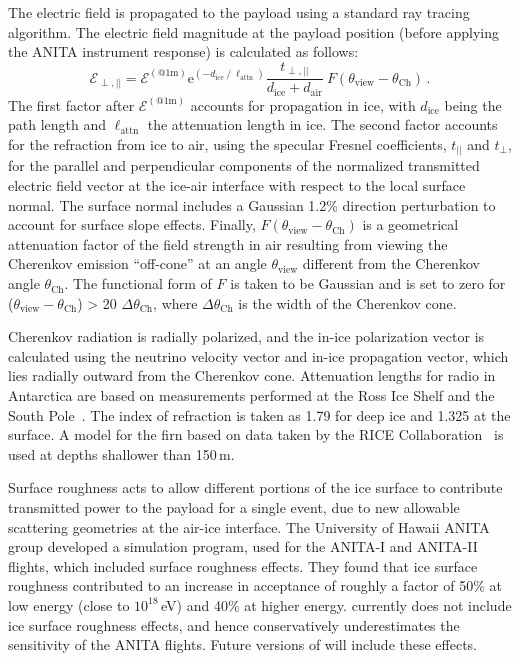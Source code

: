 The electric field is propagated to the payload using a standard ray tracing algorithm.
The electric field magnitude at the payload position (before applying
the ANITA instrument response) is calculated as follows:
\begin{equation}
 \mathcal{E}_{\perp,||} = \mathcal{E}^{(\mathrm{@ 1m})}  
 \mathrm{e}^{(-d_{\mathrm{ice}}\ /\ \ell_{\mathrm{attn}})}
 \frac{t_{\perp,||}}{d_{\mathrm{ice}} + d_{\mathrm{air}}}
 \ F(\theta_{\mathrm{view}}-\theta_{\mathrm{Ch}}) \,.
\end{equation}
The first factor after $\mathcal{E}^{(\mathrm{@ 1m})}$ accounts for propagation in ice, with $d_{\mathrm{ice}}$ being the path length and $\ell_{\mathrm{attn}}$ the attenuation length in ice. 
The second factor accounts for the refraction from ice to air, using
the specular Fresnel coefficients, $t_{||}$ and $t_{\perp}$, for the parallel and perpendicular components of the normalized transmitted electric field vector at the ice-air interface with respect to the local surface normal.
The surface normal includes a Gaussian 1.2\% direction perturbation to account for surface slope effects.
Finally, $F(\theta_{\mathrm{view}}-\theta_{\mathrm{Ch}})$ is a geometrical attenuation factor of the field strength in air resulting from viewing the Cherenkov emission ``off-cone'' at an angle $\theta_{\mathrm{view}}$ different from the Cherenkov angle $\theta_{\mathrm{Ch}}$.
The functional form of $F$ is taken to be Gaussian and is set to zero for ($\theta_{\mathrm{view}}-\theta_{\mathrm{Ch}}$) > 20 $\Delta \theta_{\mathrm{Ch}}$, where $\Delta \theta_{\mathrm{Ch}}$ is the width of the Cherenkov cone. 

Cherenkov radiation is radially polarized, and the in-ice polarization vector is calculated using the neutrino velocity vector and in-ice propagation vector, which lies radially outward from the Cherenkov cone.
Attenuation lengths for radio in Antarctica are based on measurements performed at the Ross Ice Shelf and the South Pole~\cite{smex}.
The index of refraction is taken as 1.79 for deep ice and 1.325 at the surface. A model for the firn based on data taken by the RICE Collaboration~\cite{PhysRevD.73.082002} is used at depths shallower than 150\,m.

Surface roughness acts to allow different portions of the ice surface to contribute transmitted power to the payload for a single event, due to new allowable scattering geometries at the air-ice interface.
The University of Hawaii ANITA group developed a simulation program, used for the ANITA-I and ANITA-II flights, which included surface roughness effects. They found that ice surface roughness contributed to an increase in acceptance of roughly a factor of 50\% at low energy (close to $10^{18}$\,eV) and 40\% at higher energy.
\icemc currently does not include ice surface roughness effects, and hence conservatively underestimates the sensitivity of the ANITA flights. Future versions of \icemc will include these effects.

